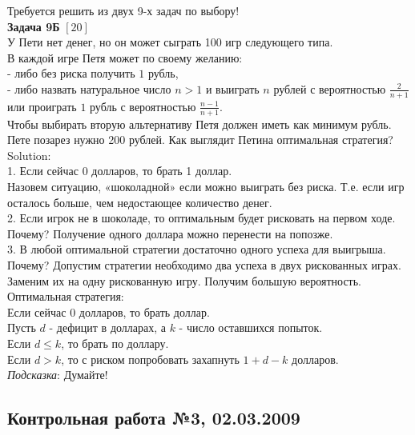 \documentclass[12pt, a4paper]{article}\usepackage[]{graphicx}\usepackage[]{color}
\begin{document}
	Требуется решить \textbf{} из двух 9-х задач по
	выбору! \\



	\textbf{Задача 9Б} $[20]$ \\
	У Пети нет денег, но он может сыграть 100 игр следующего типа. \\
	В каждой игре Петя может по своему желанию: \\
	- либо без риска получить $1$ рубль, \\
	- либо назвать натуральное число $n>1$ и выиграть $n$ рублей с вероятностью $\frac{2}{n+1}$ или проиграть $1$ рубль с вероятностью $\frac{n-1}{n+1}$. \\
	Чтобы выбирать вторую альтернативу Петя должен иметь как минимум рубль. Пете позарез нужно 200 рублей. Как выглядит Петина оптимальная стратегия? \\
	Solution: \\
	1. Если сейчас 0 долларов, то брать 1 доллар. \\
	Назовем ситуацию, «шоколадной» если можно выиграть без риска. Т.е. если игр осталось больше, чем недостающее количество денег. \\
	2. Если игрок не в шоколаде, то оптимальным будет рисковать на первом ходе. \\
	Почему? Получение одного доллара можно перенести на попозже. \\
	3. В любой оптимальной стратегии достаточно одного успеха для выигрыша. \\
	Почему? Допустим стратегии необходимо два успеха в двух рискованных играх. Заменим их  на одну рискованную игру. Получим большую вероятность. \\
	Оптимальная стратегия: \\
	Если сейчас 0 долларов, то брать доллар. \\
	Пусть $d$ - дефицит в долларах, а $k$ - число оставшихся попыток. \\
	Если $d\le k$, то брать по доллару. \\
	Если $d>k$, то с риском попробовать захапнуть $1+d-k$ долларов. \\




	\emph{Подсказка}: Думайте! \\

	\subsection{Контрольная работа №3, 02.03.2009}
\end{document}
